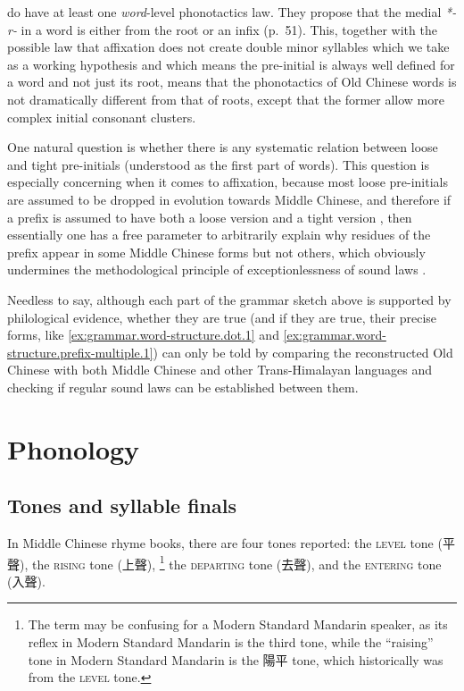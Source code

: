 \documentclass[UTF8, a4paper, oneside, scheme=plain, 12pt]{ctexrep}
\newcommand*{\citepage}[1]{p.~{#1}}
\newcommand{\form}[1]{\emph{#1}}
\newcommand*{\category}[1]{\textsc{#1}}
\begin{document}
\citet{baxter2014old} do have at least one \emph{word}-level phonotactics law.
They propose that the medial \form{*-r-} in a word is either from the root or an infix (\citepage{51}).
This, together with the possible law that affixation does not create double minor syllables
which we take as a working hypothesis and which means the pre-initial is always well defined for a word and not just its root, 
means that the phonotactics of Old Chinese words is not dramatically different from that of roots,
except that the former allow more complex initial consonant clusters.

One natural question is whether there is any systematic relation between loose and tight pre-initials (understood as the first part of words).
This question is especially concerning when it comes to affixation,
because most loose pre-initials are assumed to be dropped in evolution towards Middle Chinese,
and therefore if a prefix is assumed to have both a loose version and a tight version
\citep[\citepage{54}]{baxter2014old},
then essentially one has a free parameter to arbitrarily explain why residues of the prefix appear in some Middle Chinese forms but not others,
which obviously undermines the methodological principle of exceptionlessness of sound laws \citep[\citepage{126}]{hill2019historical}.

Needless to say, although each part of the grammar sketch above is supported by philological evidence,
whether they are true (and if they are true, their precise forms, like \ref{ex:grammar.word-structure.dot.1} and \ref{ex:grammar.word-structure.prefix-multiple.1}) can only be told by 
comparing the reconstructed Old Chinese with both Middle Chinese and other Trans-Himalayan languages 
and checking if regular sound laws can be established between them.

\section{Phonology}


\subsection{Tones and syllable finals}

In Middle Chinese rhyme books, there are four tones reported:
the \category{level} tone (平聲), the \category{rising} tone (上聲),%
\footnote{
    The term may be confusing for a Modern Standard Mandarin speaker,
    as its reflex in Modern Standard Mandarin is the third tone,
    while the ``raising'' tone in Modern Standard Mandarin is the 陽平 tone,
    which historically was from the \category{level} tone.
}
the \category{departing} tone (去聲), and the \category{entering} tone (入聲).
\end{document}
